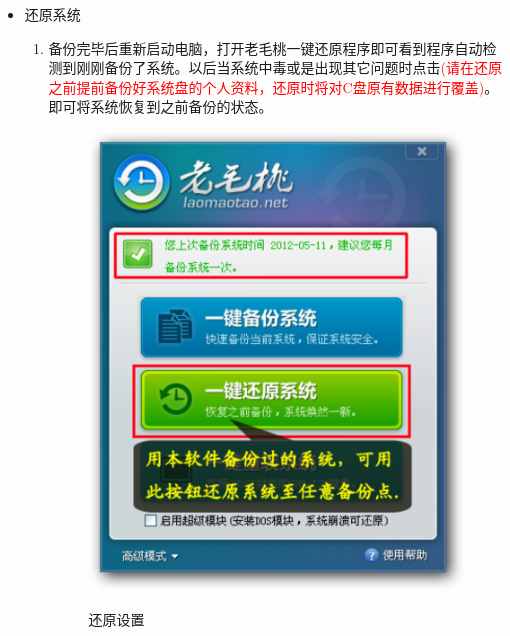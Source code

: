 \begin{itemize}
\item 还原系统\\
\begin{enumerate}
\item 备份完毕后重新启动电脑，打开老毛桃一键还原程序即可看到程序自动检测到刚刚备份了系统。以后当系统中毒或是出现其它问题时点击\textcolor{red}{(请在还原之前提前备份好系统盘的个人资料，还原时将对C盘原有数据进行覆盖)}。即可将系统恢复到之前备份的状态。\\
\begin{figure}[!htbp]
	\centering
	\caption{还原设置}  
		\includegraphics[scale=0.35]{figs/win_lmt_restore_startup.pdf}
    	\label{fig:win_lmt_backup_result}
\end{figure}
\end{enumerate}


\end{itemize}
